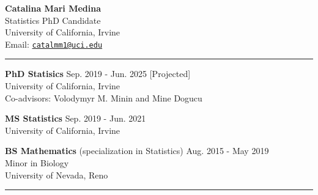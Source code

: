 \documentclass{article}
\makeatletter
\newcommand{\myname}{Catalina Mari Medina}
\newcommand{\myemail}{catalmm1@uci.edu}
\newcommand{\myhomeaddress}{Statistics PhD Candidate\\ %
	University of California, Irvine \\ 
	Email: \texttt{\href{mailto:\myemail}{\myemail}}
}
\makeatother
\begin{document}
	\thispagestyle{empty}
	\phantom{.}\vspace{-2cm}
	\begin{center}
		{\huge \bf \myname}\\
		\myhomeaddress\\
	\end{center}
	
	\vspace{-4mm}
	\rule{\linewidth}{1pt}
	
	
	\begin{description}
		\vspace{-2mm}
		\item[Education]\hspace*{.1in}
		
		\textbf{PhD Statisics} \hfill{Sep. 2019 - Jun. 2025 [Projected]} \\
		University of California, Irvine\\ 
		Co-advisors: Volodymyr M. Minin and Mine Dogucu
		\vspace*{1mm}
		
		\textbf{MS Statistics} \hfill{Sep. 2019 - Jun. 2021}\\
		University of California, Irvine
		\vspace*{1mm}
		
		\textbf{BS Mathematics} (specialization in Statistics) \hfill{Aug. 2015 - May 2019} \\
		Minor in Biology\\
		University of Nevada, Reno
		
	\end{description}
	\vspace{-2mm}
	\rule{\linewidth}{1pt}
	
\end{document}

